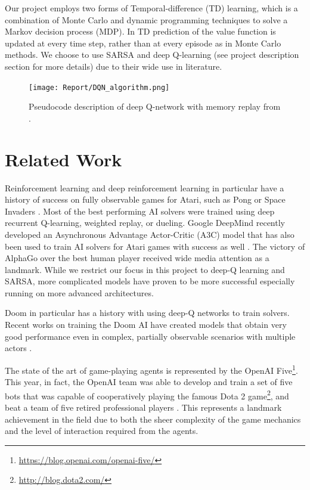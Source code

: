\documentclass[letterpaper]{article} %
\begin{document}
Our project employs two forms of Temporal-difference (TD) learning, which is a combination of Monte Carlo and dynamic programming techniques to solve a Markov decision process (MDP). In TD prediction of the value function is updated at every time step, rather than at every episode as in Monte Carlo methods. We choose to use SARSA and deep Q-learning (see project description section for more details) due to their wide use in literature.


\begin{figure}[h]
  \texttt{[image: Report/DQN\_algorithm.png]}
  \caption{Pseudocode description of deep Q-network with memory replay from \cite{mnih2015human}. }
  \label{dqn_algo}
\end{figure}

\section{Related Work}
Reinforcement learning and deep reinforcement learning in particular have a history of success on fully observable games for Atari, such as Pong or Space Invaders \cite{playing_atari}. Most of the best performing AI solvers were trained using deep recurrent Q-learning, weighted replay, or dueling. Google DeepMind recently developed an Asynchronous Advantage Actor-Critic (A3C) model that has also been used to train AI solvers for Atari games with success as well \cite{deepmind}. The victory of AlphaGo over the best human player received wide media attention as a landmark. While we restrict our focus in this project to deep-Q learning and SARSA, more complicated models have proven to be more successful especially running on more advanced architectures. 

Doom in particular has a history with using deep-Q networks to train solvers. Recent works on training the Doom AI have created models that obtain very good performance even in complex, partially observable scenarios with multiple actors \cite{lample}. 

The state of the art of game-playing agents is represented by the OpenAI Five\footnote{\url{https://blog.openai.com/openai-five/}}. This year, in fact, the OpenAI team was able to develop and train a set of five bots that was capable of cooperatively playing the famous Dota 2 game\footnote{\url{http://blog.dota2.com/}}, and beat a team of five retired professional players \cite{openaifive}. This represents a landmark achievement in the field due to both the sheer complexity of the game mechanics and the level of interaction required from the agents.  
\end{document}
